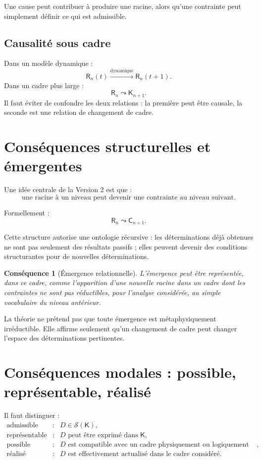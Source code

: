 \documentclass[11pt,a4paper]{article}
\newtheorem{consequence}{Conséquence}[section]
\newcommand{\Rac}{\mathsf{R}}
\newcommand{\Cadre}{\mathsf{K}}
\newcommand{\Con}{\mathsf{C}}
\newcommand{\Sol}{\mathcal{S}}
\newcommand{\nextlev}{\leadsto}
\begin{document}
Une cause peut contribuer à produire une racine, alors qu'une contrainte peut
simplement définir ce qui est admissible.

\subsection{Causalité sous cadre}

Dans un modèle dynamique :
\[
\Rac_n(t)\xrightarrow{\text{dynamique}}\Rac_n(t+1).
\]
Dans un cadre plus large :
\[
\Rac_n\nextlev\Cadre_{n+1}.
\]
Il faut éviter de confondre les deux relations : la première peut être causale,
la seconde est une relation de changement de cadre.

\section{Conséquences structurelles et émergentes}

Une idée centrale de la Version 2 est que :
\[
\boxed{
\text{une racine à un niveau peut devenir une contrainte au niveau suivant}.
}
\]

Formellement :
\[
\Rac_n\nextlev\Con_{n+1}.
\]

Cette structure autorise une ontologie récursive : les déterminations déjà
obtenues ne sont pas seulement des résultats passifs ; elles peuvent devenir
des conditions structurantes pour de nouvelles déterminations.

\begin{consequence}[Émergence relationnelle]
L'émergence peut être représentée, dans ce cadre, comme l'apparition d'une
nouvelle racine dans un cadre dont les contraintes ne sont pas réductibles,
pour l'analyse considérée, au simple vocabulaire du niveau antérieur.
\end{consequence}

La théorie ne prétend pas que toute émergence est métaphysiquement irréductible.
Elle affirme seulement qu'un changement de cadre peut changer l'espace des
déterminations pertinentes.

\section{Conséquences modales : possible, représentable, réalisé}

Il faut distinguer :
\[
\boxed{
\begin{array}{lll}
\text{admissible} &:& D\in\Sol(\Cadre),\\
\text{représentable} &:& D\text{ peut être exprimé dans }\Cadre,\\
\text{possible} &:& D\text{ est compatible avec un cadre physiquement ou logiquement autorisé},\\
\text{réalisé} &:& D\text{ est effectivement actualisé dans le cadre considéré.}
\end{array}
}
\]
\end{document}
